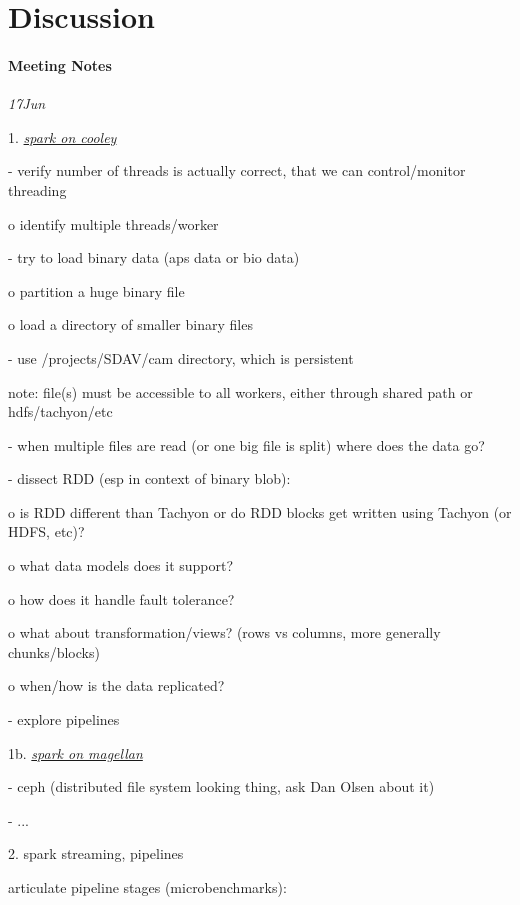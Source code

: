 \section{Discussion}


\paragraph{Meeting Notes}\label{meeting-notes}

\emph{17Jun}

1.
\href{https://docs.google.com/document/d/1fq3z1-oEcCBhjKA__vl8LsVm3-uArJik7YFLYvYoN1Y/edit?usp=sharing}{\emph{spark
		on cooley}}

- verify number of threads is actually correct, that we can
control/monitor threading

o identify multiple threads/worker

- try to load binary data (aps data or bio data)

o partition a huge binary file

o load a directory of smaller binary files

- use /projects/SDAV/cam directory, which is persistent

note: file(s) must be accessible to all workers, either through shared
path or hdfs/tachyon/etc

- when multiple files are read (or one big file is split) where does the
data go?

- dissect RDD (esp in context of binary blob):

o is RDD different than Tachyon or do RDD blocks get written using
Tachyon (or HDFS, etc)?

o what data models does it support?

o how does it handle fault tolerance?

o what about transformation/views? (rows vs columns, more generally
chunks/blocks)

o when/how is the data replicated?

- explore pipelines

1b.
\href{https://docs.google.com/document/d/1lyzEHap1EznES0DKiMa3fsalepqPD6vnbZqSEMjCVPQ/edit?usp=sharing}{\emph{spark
		on magellan}}

- ceph (distributed file system looking thing, ask Dan Olsen about it)

- ...

2. spark streaming, pipelines

articulate pipeline stages (microbenchmarks):

